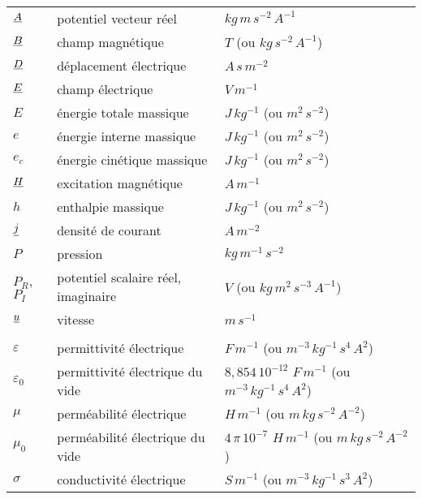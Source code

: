 \begin{tabular}{lp{6cm}l}
$\underline{A}$        &potentiel vecteur réel        &$kg\,m\,s^{-2}\,A^{-1}$ \\
$\underline{B}$        &champ magnétique                 &$T$ (ou $kg\,s^{-2}\,A^{-1}$) \\
$\underline{D}$         &déplacement électrique        &$A\,s\,m^{-2}$ \\
$\underline{E}$         &champ électrique                 &$V\,m^{-1}$ \\
$E$                 &énergie totale massique         &$J\,kg^{-1}$ (ou $m^{2}\,s^{-2}$) \\
$e$                 &énergie interne massique         &$J\,kg^{-1}$ (ou $m^{2}\,s^{-2}$) \\
$e_c$                 &énergie cinétique massique &$J\,kg^{-1}$ (ou $m^{2}\,s^{-2}$) \\
$\underline{H}$         &excitation magnétique        &$A\,m^{-1}$ \\
$h$                   &enthalpie massique                 &$J\,kg^{-1}$ (ou $m^{2}\,s^{-2}$) \\
$\underline{j}$        &densité de courant                 &$A\,m^{-2}$  \\
$P$                   &pression                         &$kg\,m^{-1}\,s^{-2}$ \\
$P_R$, $P_I$         &potentiel scalaire réel, imaginaire
                                                &$V$ (ou $kg\,m^{2}\,s^{-3}\,A^{-1}$) \\
$\underline{u}$         &vitesse                        &$m\,s^{-1}$  \\
                 &                                & \\
$\varepsilon$ &permittivité électrique
                                                &$F\,m^{-1}$ (ou $m^{-3}\,kg^{-1}\,s^{4}\,A^{2}$) \\
$\varepsilon_0$ &permittivité électrique du vide
                                                &$8,854\,10^{-12}\,\,F\,m^{-1}$ (ou $m^{-3}\,kg^{-1}\,s^{4}\,A^{2}$) \\
$\mu$           &perméabilité électrique
                                                &$H\,m^{-1}$ (ou $m\,kg\,s^{-2}\,A^{-2}$)\\
$\mu_0$         &perméabilité électrique du vide
                                                &$4\,\pi\,10^{-7}\,\,H\,m^{-1}$ (ou $m\,kg\,s^{-2}\,A^{-2}$)\\
$\sigma$         &conductivité électrique        &$S\,m^{-1}$ (ou $m^{-3}\,kg^{-1}\,s^3\,A^2$)\\
\end{tabular}

